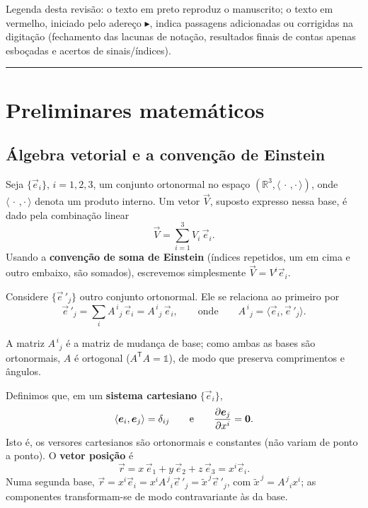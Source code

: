 \begin{nota}
Legenda desta revisão: o texto em preto reproduz o manuscrito; o texto em
vermelho, iniciado pelo adereço $\blacktriangleright$, indica passagens
adicionadas ou corrigidas na digitação (fechamento das lacunas de notação,
resultados finais de contas apenas esboçadas e acertos de sinais/índices).
\end{nota}

\tableofcontents
\bigskip
\hrule
\bigskip

\section{Preliminares matemáticos}

\subsection{Álgebra vetorial e a convenção de Einstein}

Seja $\{\vec{e}_i\}$, $i=1,2,3$, um conjunto ortonormal no espaço
$(\mathbb{R}^3,\langle\,\cdot\,,\cdot\,\rangle)$, onde $\langle\,\cdot\,,\cdot\,\rangle$
denota um produto interno. Um vetor $\vec{V}$, suposto expresso nessa base, é dado
pela combinação linear
\begin{equation}
  \vec{V}=\sum_{i=1}^{3} V_i\,\vec{e}_i .
\end{equation}
Usando a \textbf{convenção de soma de Einstein} (índices repetidos, um em cima e
outro embaixo, são somados), escrevemos simplesmente $\vec{V}=V^{i}\vec{e}_i$.

Considere $\{\vec{e}\,'_j\}$ outro conjunto ortonormal. Ele se relaciona ao
primeiro por
\begin{equation}
  \vec{e}\,'_j=\sum_i A^{\,i}{}_{j}\,\vec{e}_i=A^{\,i}{}_{j}\,\vec{e}_i,
  \qquad\text{onde}\qquad
  A^{\,i}{}_{j}=\langle \vec{e}_i,\vec{e}\,'_j\rangle .
\end{equation}
\begin{nota}
A matriz $A^{\,i}{}_{j}$ é a matriz de mudança de base; como ambas as bases são
ortonormais, $A$ é ortogonal ($A^{\mathsf{T}}A=\mathbb{1}$), de modo que
preserva comprimentos e ângulos.
\end{nota}

Definimos que, em um \textbf{sistema cartesiano} $\{\vec{e}_i\}$,
\begin{equation}
  \langle \bm{e}_i,\bm{e}_j\rangle=\delta_{ij}
  \qquad\text{e}\qquad
  \dfrac{\partial \bm{e}_j}{\partial x^i}=\bm{0}.
  \label{eq:cartesiano}
\end{equation}
Isto é, os versores cartesianos são ortonormais e constantes (não variam de ponto
a ponto). O \textbf{vetor posição} é
\begin{equation}
  \vec{r}=x\,\vec{e}_1+y\,\vec{e}_2+z\,\vec{e}_3=x^{i}\vec{e}_i .
\end{equation}
Numa segunda base, $\vec{r}=x^{i}\vec{e}_i=x^{i}A^{\,j}{}_{i}\vec{e}\,'_j
=\tilde{x}^{\,j}\vec{e}\,'_j$, com $\tilde{x}^{\,j}=A^{\,j}{}_{i}x^{i}$; as
componentes transformam-se de modo contravariante às da base.

